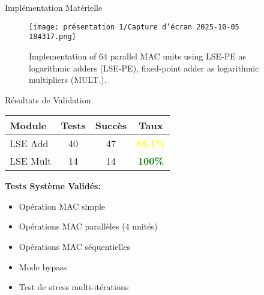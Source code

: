\documentclass[aspectratio=169]{beamer}
\begin{document}
\begin{frame}{Implémentation Matérielle}

\begin{figure}
    \centering
    \texttt{[image: présentation 1/Capture d'écran 2025-10-05 184317.png]}
    \caption{Implementation of 64 parallel MAC units using
LSE-PE as logarithmic adders (LSE-PE), fixed-point adder as
logarithmic multipliers (MULT.).}
   \label{fig:lse-mac-implementation}
\end{figure}
    
\end{frame}

\begin{frame}{Résultats de Validation}
\begin{table}
\small
\begin{tabular}{|l|c|c|c|}
\hline
\textbf{Module} & \textbf{Tests} & \textbf{Succès} & \textbf{Taux} \\
\hline
LSE Add & 40 & 47 & \textcolor{yellow}{\textbf{85.1\%}} \\
\hline
LSE Mult & 14 & 14 & \textcolor{green}{\textbf{100\%}} \\
\hline
\end{tabular}
\end{table}

\vspace{0.3cm}
\textbf{Tests Système Validés:}
\begin{itemize}
\item  Opération MAC simple
\item  Opérations MAC parallèles (4 unités)
\item  Opérations MAC séquentielles
\item  Mode bypass
\item  Test de stress multi-itérations
\end{itemize}
\end{frame}
\end{document}
